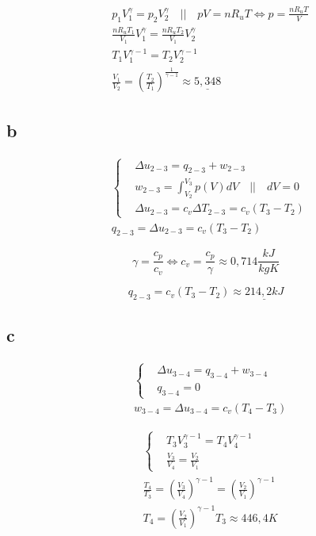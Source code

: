 \documentclass[12pt,a4paper,finnish]{article}
\begin{document}
\begin{align}
  & p_1V_1^{\gamma} = p_2V_2^{\gamma} \quad \bigg|\bigg| \quad pV = nR_uT \Leftrightarrow p = \frac{nR_uT}{V}\\
  & \frac{nR_uT_1}{V_1}V_1^{\gamma} = \frac{nR_uT_2}{V_1}V_2^{\gamma}\\
  & T_1V_1^{\gamma - 1} = T_2V_2^{\gamma - 1}\\
  & \frac{V_1}{V_2} = \left(\frac{T_2}{T_1}\right)^{\frac{1}{\gamma - 1}} \approx \underline{5,348}
\end{align}

\subsection{b}

\begin{align}
 &\left\{
 \begin{aligned}
  &\Delta u_{2-3} = q_{2-3} + w_{2-3}\\
  &w_{2-3} = \int_{V_2}^{V_3}p(V)dV \quad \bigg|\bigg| \quad dV = 0\\
  &\Delta u_{2-3} = c_v\Delta T_{2-3} = c_v(T_3 - T_2) 
 \end{aligned}\right.\\
 &q_{2-3} = \Delta u_{2-3} = c_v(T_3 - T_2)
\end{align}

\begin{equation}
 \gamma = \frac{c_p}{c_v} \Leftrightarrow c_v = \frac{c_p}{\gamma} \approx 0,714 \frac{kJ}{kgK}
\end{equation}

\begin{equation}
 q_{2-3} = c_v(T_3 - T_2) \approx \underline{214,2 kJ}
\end{equation}

\subsection{c}

\begin{align}
 &\left\{
 \begin{aligned}
  &\Delta u_{3-4} = q_{3-4} + w_{3-4}\\
  &q_{3-4} = 0
 \end{aligned}\right.\\
 &w_{3-4} = \Delta u_{3-4} = c_v(T_4 - T_3)
\end{align}

\begin{align}
 &\left\{
 \begin{aligned}
  & T_3V_3^{\gamma - 1} = T_4V_4^{\gamma - 1}\\
  &\frac{V_3}{V_4} = \frac{V_2}{V_1}
 \end{aligned}\right.\\
 & \frac{T_4}{T_3} = \left(\frac{V_3}{V_4}\right)^{\gamma - 1} = \left(\frac{V_2}{V_1}\right)^{\gamma - 1}\\
 &T_4 = \left(\frac{V_2}{V_1}\right)^{\gamma - 1}T_3 \approx 446,4K
\end{align}
\end{document}
